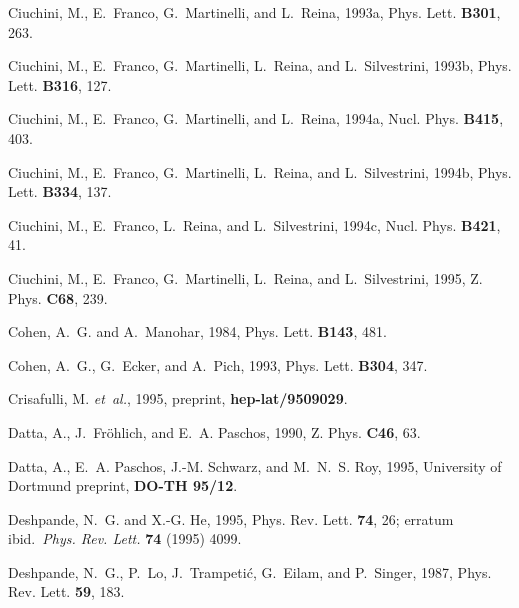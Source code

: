 \begin{thebibliography}{\protect{}1991}
Ciuchini, M., E.~Franco, G.~Martinelli, and L.~Reina, 1993a,
\newblock Phys. Lett. {\bf B301}, 263.

Ciuchini, M., E.~Franco, G.~Martinelli, L.~Reina, and L.~Silvestrini, 1993b,
\newblock Phys. Lett. {\bf B316}, 127.

Ciuchini, M., E.~Franco, G.~Martinelli, and L.~Reina, 1994a,
\newblock Nucl. Phys. {\bf B415}, 403.

Ciuchini, M., E.~Franco, G.~Martinelli, L.~Reina, and L.~Silvestrini, 1994b,
\newblock Phys. Lett. {\bf B334}, 137.

Ciuchini, M., E.~Franco, L.~Reina, and L.~Silvestrini, 1994c,
\newblock Nucl. Phys. {\bf B421}, 41.

Ciuchini, M., E.~Franco, G.~Martinelli, L.~Reina, and L.~Silvestrini, 1995,
\newblock Z. Phys. {\bf C68}, 239.

Cohen, A.~G. and A.~Manohar, 1984,
\newblock Phys. Lett. {\bf B143}, 481.

Cohen, A.~G., G.~Ecker, and A.~Pich, 1993,
\newblock Phys. Lett. {\bf B304}, 347.

Crisafulli, M. {\em et~al.\/}, 1995,
\newblock preprint, {\bf hep-lat/9509029}.

Datta, A., J.~Fr{\"o}hlich, and E.~A. Paschos, 1990,
\newblock Z. Phys. {\bf C46}, 63.

Datta, A., E.~A. Paschos, J.-M. Schwarz, and M.~N.~S. Roy, 1995,
\newblock University of Dortmund preprint, {\bf DO-TH 95/12}.

Deshpande, N.~G. and X.-G. He, 1995,
\newblock Phys. Rev. Lett. {\bf 74}, 26; erratum ibid.\ {\em Phys. Rev. Lett.}
  {\bf 74} (1995) 4099.

Deshpande, N.~G., P.~Lo, J.~Trampeti{\'c}, G.~Eilam, and P.~Singer, 1987,
\newblock Phys. Rev. Lett. {\bf 59}, 183.


\end{thebibliography}
